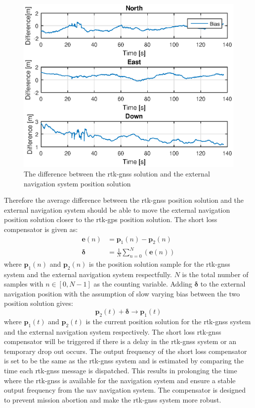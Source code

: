 \begin{figure}[H]
\centering
\includegraphics[scale=0.8]{figs/Experiment/biasShow.eps}
\caption{The difference between the \gls{rtk-gnss} solution and the external navigation system position solution}
\label{Fig:RtkExtDiff}
\end{figure}
Therefore the average difference between the \gls{rtk-gnss} position solution and the external navigation system should be able to move the external navigation position solution closer to the \gls{rtk-gps} position solution. The short loss compensator is given as:
\begin{align}
\mathbf{e}(n) &= \mathbf{p}_1(n) - \mathbf{p}_2(n)\\
\mathbf{\delta} &= \frac{1}{N}\sum_{n=0}^N(\mathbf{e}(n))
\end{align}
where $\mathbf{p}_1(n)$ and $\mathbf{p}_2(n)$ is the position solution sample for the \gls{rtk-gnss} system and the external navigation system respectfully. $N$ is the total number of samples with $n\in [0,N-1]$ as the counting variable. Adding $\mathbf{\delta}$ to the external navigation position with the assumption of slow varying bias between the two position solution gives:
\begin{equation}
\mathbf{p}_2(t) + \mathbf{\delta} \rightarrow \mathbf{p}_1(t)
\end{equation}
where $\mathbf{p}_1(t)$ and $\mathbf{p}_2(t)$ is the current position solution for the \gls{rtk-gnss} system and the external navigation system respectively. The short loss \gls{rtk-gnss} compensator will be triggered if there is a delay in the \gls{rtk-gnss} system or an temporary drop out occurs. The output frequency of the short loss compensator is set to be the same as the \gls{rtk-gnss} system and is estimated by comparing the time each \gls{rtk-gnss} message is dispatched. This results in prolonging the time where the \gls{rtk-gnss} is available for the navigation system and ensure a stable output frequency from the \gls{uav} navigation system. The compensator is designed to prevent mission abortion and make the \gls{rtk-gnss} system more robust.
